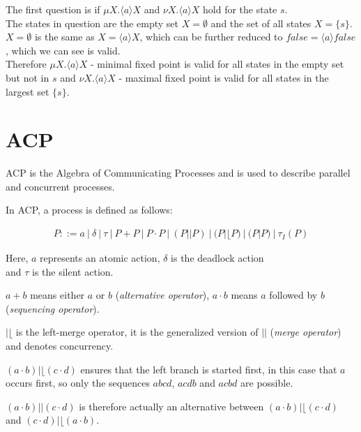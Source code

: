 \documentclass{clseminar}
\begin{document}
  \begin{center}
  \end{center}

  The first question is if $\mu X. \langle a \rangle X$ and $\nu X. \langle a \rangle X$ hold for the state $s$. \\
  The states in question are the empty set $X = \emptyset$ and the set of all states $X = \{s\}$. \\
  $X = \emptyset$ is the same as $X = \langle a \rangle X$, which can be further reduced to $\mathit{false} = \langle a \rangle \mathit{false}$, which we can see is valid. \\
  Therefore $\mu X. \langle a \rangle X$ - minimal fixed point is valid for all states in the empty set but not in $s$ and $\nu X. \langle a \rangle X$ - maximal fixed point is valid for all states in the largest set $\{s\}$.

  \section{ACP}

  ACP is the Algebra of Communicating Processes and is used to describe parallel and concurrent processes.

  In ACP, a process is defined \cite{acp_wiki} as follows:

  \begin{align*}
    P ::= a\ |\ \delta\ |\ \tau\ |\ P + P\ |\ P \cdot P\ |\ (P || P)\ |\ (P |\lfloor P)\ |\ (P | P)\ |\ \tau_I(P)
  \end{align*}

  Here, $a$ represents an atomic action, $\delta$ is the deadlock action \\ and $\tau$ is the silent action.

  $a + b$ means either $a$ or $b$ (\textit{alternative operator}), $a \cdot b$ means $a$ followed by $b$ (\textit{sequencing operator}).

  $|\lfloor$ is the left-merge operator, it is the generalized version of $||$ (\textit{merge operator}) and denotes concurrency.
  \\
  \begin{example}
    $(a \cdot b) |\lfloor (c \cdot d)$ ensures that the left branch is started first, in this case that $a$ occurs first, so only the sequences $abcd$, $acdb$ and $acbd$ are possible.

    $(a \cdot b) || (c \cdot d)$ is therefore actually an alternative between $(a \cdot b) |\lfloor (c \cdot d)$ and $(c \cdot d) |\lfloor (a \cdot b)$.
  \end{example}
\end{document}
